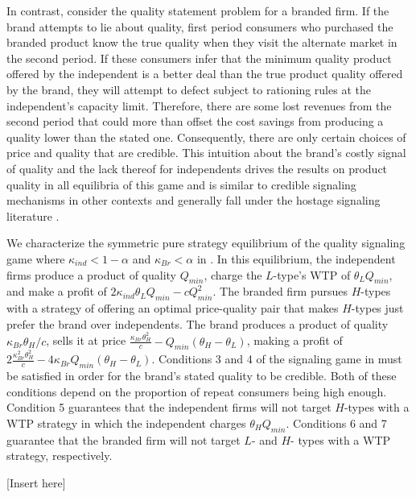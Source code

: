 \documentclass{informs_mod} %
\begin{document}
In contrast, consider the quality statement problem for a branded firm. If the brand attempts to lie about quality, first period consumers who purchased the branded product know the true quality when they visit the alternate market in the second period. If these consumers infer that the minimum quality product offered by the independent is a better deal than the true product quality offered by the brand, they will attempt to defect subject to rationing rules at the independent's capacity limit. Therefore, there are some lost revenues from the second period that could more than offset the cost savings from producing a quality lower than the stated one. Consequently, there are only certain choices of price and quality that are credible. This intuition about the brand's costly signal of quality and the lack thereof for independents drives the results on product quality in all equilibria of this game and is similar to credible signaling mechanisms in other contexts \citep{spence1978job,milgrom1986price} and generally fall under the hostage signaling literature \citep{williamson1983credible}.

We characterize the symmetric pure strategy equilibrium of the quality signaling game where $\kappa_{ind}<1-\alpha$ and $\kappa_{Br}<\alpha$ in . In this equilibrium, the independent firms produce a product of quality $Q_{min}$, charge the $L$-type's WTP of $\theta_LQ_{min}$, and make a profit of $2 \kappa_{ind} \theta_L Q_{min} - c Q_{min}^2$. The branded firm pursues $H$-types with a strategy of offering an optimal price-quality pair that makes $H$-types just prefer the brand over independents. The brand produces a product of quality $\kappa_{Br}\theta_H/c$, sells it at price $\frac{\kappa_{Br}\theta_H^2}{c}-Q_{min}(\theta_H-\theta_L)$, making a profit of $2\frac{\kappa_{Br}^2\theta_H^2}{c}-4\kappa_{Br} Q_{min}(\theta_H-\theta_L)$. Conditions 3 and 4 of the signaling game in  must be satisfied in order for the brand's stated quality to be credible. Both of these conditions depend on the proportion of repeat consumers being high enough. Condition 5 guarantees that the independent firms will not target $H$-types with a WTP strategy in which the independent charges $\theta_HQ_{min}$. Conditions 6 and 7 guarantee that the branded firm will not target $L$- and $H$- types with a WTP strategy, respectively. 

[Insert  here]
\end{document}
